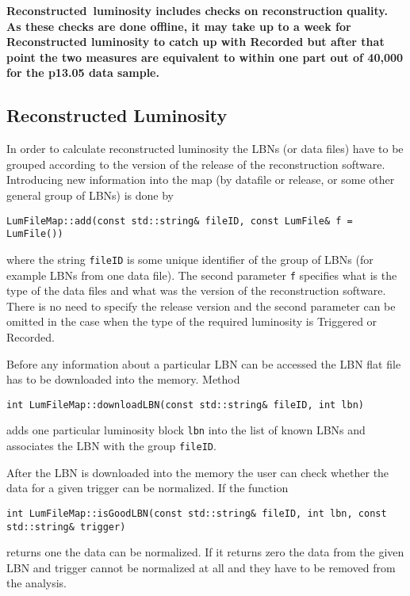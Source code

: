 \documentclass[12pt]{article}
\begin{document}
\bf Reconstructed\rm \ luminosity includes checks on reconstruction quality.  As
these checks are done offline, it may take up to a week for {\bf Reconstructed}
luminosity to catch up with {\bf Recorded} but after that point the two measures
are
equivalent to within one part out of 40,000 for the p13.05 data sample.

\subsection{Reconstructed Luminosity}

In order to calculate reconstructed luminosity the LBNs (or data
files) have to be grouped according to the version of the release of
the reconstruction software. Introducing new information into the map
 (by datafile or release, or
some other general group of LBNs) is done by

\begin{flushleft}
\hspace*{4mm} {\tt LumFileMap::add(const std::string\& fileID, const
LumFile\& f = LumFile())}
\end{flushleft}

where the string {\tt fileID} is some unique identifier of the group
 of LBNs (for example LBNs from one data file). The second parameter
 {\tt f} specifies what is the type of the data files and what was the
 version of the reconstruction software. There is no need to specify
 the release version and the second parameter can be omitted in the
 case when the type of the required luminosity is Triggered or
 Recorded.

Before any information about a particular LBN can be accessed the LBN
flat file has to be downloaded into the memory. Method
\begin{flushleft}
\hspace*{4mm} {\tt int LumFileMap::downloadLBN(const std::string\& fileID, int lbn)}
\end{flushleft}
adds one particular luminosity block {\tt lbn} into the list of known LBNs and
associates the LBN with the group {\tt fileID}.

After the LBN is downloaded into the memory the user can check whether the data
 for a given trigger can be normalized. If the function
\begin{flushleft}
\hspace*{4mm} {\tt int LumFileMap::isGoodLBN(const std::string\& fileID, int lbn,
\hspace*{61.82mm}const std::string\& trigger)}
\end{flushleft}
returns one the data can be normalized.
If it returns zero the data from the given LBN and trigger cannot be
normalized at all and they have to be removed from the analysis.
\end{document}
